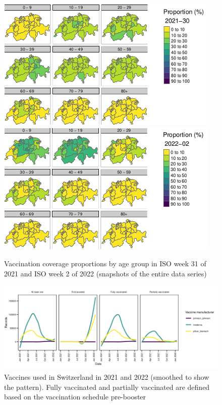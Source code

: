 \documentclass[authordate, rga]{jote-new-article}
\begin{document}
\begin{figure}[b!]
  \begin{fullwidth}
    \centering
    \includegraphics[width=.49\linewidth]{media/image4a.png}
    \includegraphics[width=.49\linewidth]{media/image4b.png}

    \caption{Vaccination coverage proportions by age group in ISO week 31 of 2021 and ISO week 2 of 2022 (snapshots of the entire data series)}

    \label{fig:rId8}
  \end{fullwidth}
\end{figure}

\begin{figure}[t!]
  \begin{fullwidth}
    \centering
    \includegraphics[width=.9\linewidth]{media/image5.png}

    \caption{Vaccines used in Switzerland in 2021 and 2022 (smoothed to show the pattern). Fully vaccinated and partially vaccinated are defined based on the vaccination schedule pre-booster}

    \label{fig:rId9}
  \end{fullwidth}


\end{figure}
\end{document}
